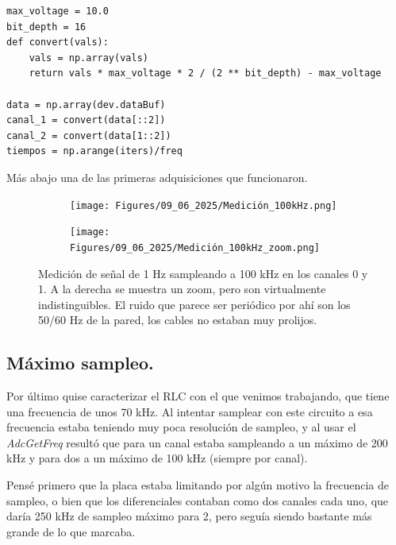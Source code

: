 \begin{lstlisting}
max_voltage = 10.0
bit_depth = 16
def convert(vals):
	vals = np.array(vals)
	return vals * max_voltage * 2 / (2 ** bit_depth) - max_voltage
	
data = np.array(dev.dataBuf)
canal_1 = convert(data[::2])
canal_2 = convert(data[1::2])
tiempos = np.arange(iters)/freq
\end{lstlisting}

Más abajo una de las primeras adquisiciones que funcionaron.



\begin{figure}[!ht]
	\begin{minipage}[c]{0.5\textwidth}
			\begin{subfigure}{\textwidth}
					\centering
					\texttt{[image: Figures/09\_06\_2025/Medición\_100kHz.png]}
					\captionsetup{width=0.8\textwidth}
					\subcaption{}
				\end{subfigure}
		\end{minipage}\begin{minipage}[c]{0.49\textwidth}
			\begin{subfigure}{\textwidth}
					\centering
					\texttt{[image: Figures/09\_06\_2025/Medición\_100kHz\_zoom.png]}
					\captionsetup{width=0.8\textwidth}
					\subcaption{}
				\end{subfigure}
		\end{minipage}
	\caption{Medición de señal de 1 Hz sampleando a 100 kHz en los canales 0 y 1. A la derecha se muestra un zoom, pero son virtualmente indistinguibles. El ruido que parece ser periódico por ahí son los 50/60 Hz de la pared, los cables no estaban muy prolijos.}
	\label{fig:medición_100kHz_y_zoom}
\end{figure}

\subsection{Máximo sampleo.}
Por último quise caracterizar el RLC con el que venimos trabajando, que tiene una frecuencia de unos 70 kHz. Al intentar samplear con este circuito a esa frecuencia estaba teniendo muy poca resolución de sampleo, y al usar el \textit{AdcGetFreq} resultó que para un canal estaba sampleando a un máximo de 200 kHz y para dos a un máximo de 100 kHz (siempre por canal). 

Pensé primero que la placa estaba limitando por algún motivo la frecuencia de sampleo, o bien que los diferenciales contaban como dos canales cada uno, que daría 250 kHz de sampleo máximo para 2, pero seguía siendo bastante más grande de lo que marcaba. 

